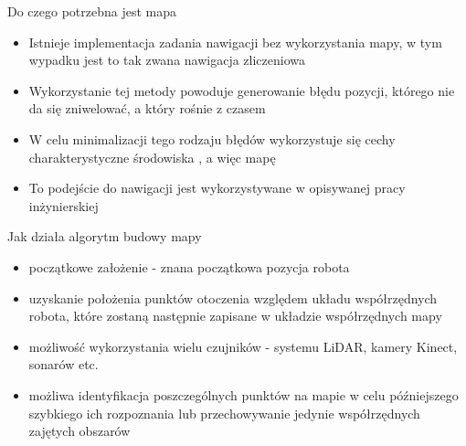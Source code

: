 

\begin{frame}{Do czego potrzebna jest mapa}
	\begin{itemize}
		\item Istnieje implementacja zadania nawigacji bez wykorzystania mapy, w tym wypadku jest to tak zwana nawigacja zliczeniowa
		\item Wykorzystanie tej metody powoduje generowanie błędu pozycji, którego nie da się zniwelować, a który rośnie z czasem
		\item W celu minimalizacji tego rodzaju błędów wykorzystuje się cechy charakterystyczne środowiska \cite{robotics_vision_dead_reckon}, a więc mapę
		\item To podejście do nawigacji jest wykorzystywane w opisywanej pracy inżynierskiej
	\end{itemize}
	
\end{frame}

\begin{frame}{Jak działa algorytm budowy mapy}
	\begin{itemize}
		\item początkowe założenie - znana początkowa pozycja robota
		\item uzyskanie położenia punktów otoczenia względem układu współrzędnych robota, które zostaną następnie zapisane w układzie współrzędnych mapy
		\item możliwość wykorzystania wielu czujników - systemu LiDAR, kamery Kinect, sonarów etc.
		\item możliwa identyfikacja poszczególnych punktów na mapie w celu późniejszego szybkiego ich rozpoznania lub przechowywanie jedynie współrzędnych zajętych obszarów
	\end{itemize}
\end{frame}

